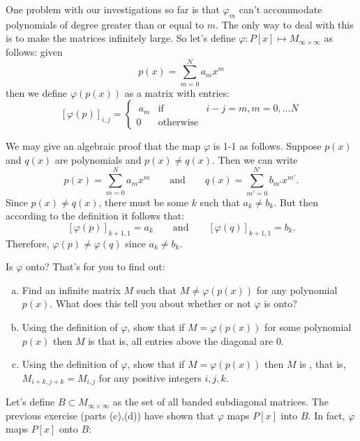 One  problem with our investigations so far is that $\varphi_m$ can't accommodate polynomials of degree greater than or equal to $m$. The only way to deal with this is to make the matrices infinitely large. So  let's define $\varphi : P[x] \mapsto M_{\infty \times \infty}$ as follows: given 
\[p(x) =\sum^ {N}_{m=0} a_{m}x^{m}\] 
then we define $\varphi(p(x))$ as a matrix with entries:
\[[\varphi(p)]_{i,j} = \left\{\begin{array}{rcl}\ a_m  &\mbox{if}&   i - j = m,   m=0,... N \\  0 &\mbox{otherwise}& \end{array}\right.\]

We may  give an algebraic proof that the map $\varphi$ is  1-1 as follows.
Suppose $p(x)$ and $q(x)$ are polynomials and $p(x) \neq q(x)$. Then we can write
\[p(x) = \sum^ {N}_{m=0} a_{m}x^{m}\qquad \text{and} \qquad q(x) = \sum^ {N'}_{m'=0} b_{m'}x^{m'}.\]
Since $p(x) \neq q(x)$, there must be some $k$ such that $ a_k \neq b_k $.
But then according to the definition it follows that:
\[[\varphi(p)]_{k+1, 1} = a_k \qquad \text{and} \qquad [\varphi(q)]_{k+1, 1} = b_k.\]
Therefore, $\varphi(p) \neq \varphi(q)$ since $a_k \neq b_k$.

Is $\varphi$ onto? That's for you to find out:

\begin{exercise}{}
\begin{enumerate}[(a)]
\item
Find an infinite matrix $M$ such that $M \neq \varphi(p(x))$ for any polynomial $p(x)$.  What does this tell you about whether or not $\varphi$ is onto?
\item
Using the definition of $\varphi$, show that if $M = \varphi(p(x))$ for some polynomial $p(x)$ then $M$ is  that is, all entries above the diagonal are 0.
\item
Using the definition of $\varphi$, show that if $M = \varphi(p(x))$ then $M$ is , that is, $M_{i+k, j+k} = M_{i, j}$ for any positive integers $i, j, k$.
\end{enumerate}
\end{exercise}

 Let's  define $B\subset M_{\infty \times \infty}$ as the set of all banded subdiagonal matrices. The previous exercise (parts (c),(d))  have shown that $\varphi$ maps $P[x]$ into $B$. In fact, $\varphi$ maps $P[x]$ onto $B$:

